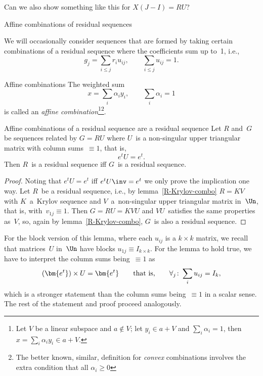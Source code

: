 \begin{question}
 Can we also show something like this for $X(J-I)=RU$?
\end{question}

 {Affine combinations of residual sequences}
\label{sec:affine-res}

We will occasionally consider sequences that are formed by taking
certain combinations of a residual sequence where the coefficients sum
up to~1, i.e.,
\begin{equation}
        g_j = \sum_{i\leq j}r_iu_{ij},\qquad \sum_{i\leq j}u_{ij}=1.
        \label{eq:affine-combo}\end{equation}

\begin{ddefinition}{Affine combinations}
The weighted sum \[ x=\sum_i\alpha_i y_i,\qquad \sum_i\alpha_i=1 \]
is called an {\em affine combination}\footnote{Let $V$ be a linear
  subspace and $a\not\in V$; let $y_i\in a+V$ and $\sum_i\alpha_i=1$,
  then $x=\sum_i\alpha_i y_i\in a+V$.}\footnote{The better known,
  similar, definition for {\em convex} combinations involves the extra
  condition that all $\alpha_i\geq0$}.
\end{ddefinition}

\begin{llemma}{Affine combinations of a residual sequence are a 
residual sequence}\label{lemma:combo-res-seq}
Let $R$ and~$G$ be sequences related by $G=RU$ where $U$~is a
non-singular upper
triangular matrix with column sums~$\equiv1$, that is, \[e^tU=e^t.\]
Then $R$~is a residual sequence iff $G$~is a residual sequence.
\end{llemma}
\begin{proof} Noting that $e^tU=e^t$ iff $e^tU\inv=e^t$ we only prove
the implication one way. Let $R$~be a residual sequence, i.e.,
by lemma~\ref{R-Krylov-combo} $R=KV$ with $K$~a~Krylov sequence 
and $V$~a~non-singular upper triangular matrix in~$\Un$, that is,
with~$v_{1j}\equiv1$. Then $G=RU=KVU$ and $VU$~satisfies the same
properties as~$V$, so, again by lemma~\ref{R-Krylov-combo}, $G$~is
also a residual sequence.\end{proof}

\begin{block}
For the block version of this lemma,
where each $u_{ij}$ is a $k\times k$ matrix,
we recall that matrices~$U$ in~$\Un$ have blocks $u_{1j}\equiv I_{k\times k}$.
For the lemma to hold true, we have to interpret the column sums
being~$\equiv 1$ as
\begin{equation} (\bm{e^t})\times U=\bm{e^t}
    \qquad\hbox{that is,}\qquad \forall_j\colon \sum_iu_{ij}=I_k,
    \label{eq:block-1colsum}\end{equation}
which is a stronger statement than the column sums being~$\equiv1$
in a scalar sense.
The rest of the statement and proof proceed analogously.
\end{block}

